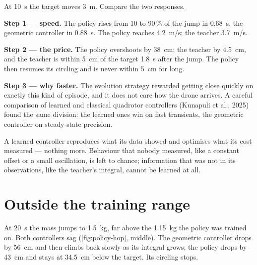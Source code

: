 \begin{example}
\label{ex:policy-step}
At \SI{10}{s} the target moves \SI{3}{m}. Compare the two responses.

\textbf{Step 1 — speed.} The policy rises from 10 to 90\,\% of the jump in \SI{0.68}{s}, the geometric controller in \SI{0.88}{s}. The policy reaches \SI{4.2}{m/s}; the teacher \SI{3.7}{m/s}.

\textbf{Step 2 — the price.} The policy overshoots by \SI{38}{cm}; the teacher by \SI{4.5}{cm}, and the teacher is within \SI{5}{cm} of the target \SI{1.8}{s} after the jump. The policy then resumes its circling and is never within \SI{5}{cm} for long.

\textbf{Step 3 — why faster.} The evolution strategy rewarded getting close quickly on exactly this kind of episode, and it does not care how the drone arrives. A careful comparison of learned and classical quadrotor controllers (Kunapuli et al., 2025) found the same division: the learned ones win on fast transients, the geometric controller on steady-state precision.
\end{example}

\begin{keyidea}
A learned controller reproduces what its data showed and optimises what its cost measured — nothing more. Behaviour that nobody measured, like a constant offset or a small oscillation, is left to chance; information that was not in its observations, like the teacher's integral, cannot be learned at all.
\end{keyidea}


\section{Outside the training range}

At \SI{20}{s} the mass jumps to \SI{1.5}{kg}, far above the \SI{1.15}{kg} the policy was trained on. Both controllers sag (\cref{fig:policy-hop}, middle). The geometric controller drops by \SI{56}{cm} and then climbs back slowly as its integral grows; the policy drops by \SI{43}{cm} and stays at \SI{34.5}{cm} below the target. Its circling stops.

